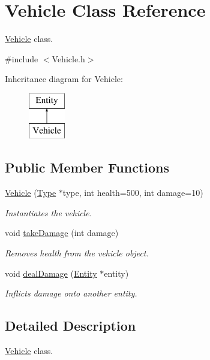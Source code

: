 \hypertarget{classVehicle}{}\section{Vehicle Class Reference}
\label{classVehicle}


\hyperlink{classVehicle}{Vehicle} class.  




{\ttfamily \#include $<$Vehicle.\+h$>$}

Inheritance diagram for Vehicle\+:\begin{figure}[H]
\begin{center}
\leavevmode
\includegraphics[height=2.000000cm]{classVehicle}
\end{center}
\end{figure}
\subsection*{Public Member Functions}
\begin{DoxyCompactItemize}
\item 
\hyperlink{classVehicle_a6fb25af1c4f5a69022a64d25308d60e0}{Vehicle} (\hyperlink{classType}{Type} $\ast$type, int health=500, int damage=10)
\begin{DoxyCompactList}\small\item\em Instantiates the vehicle. \end{DoxyCompactList}\item 
void \hyperlink{classVehicle_ae30a3d13e4d254993acf808a94fdff8d}{take\+Damage} (int damage)
\begin{DoxyCompactList}\small\item\em Removes health from the vehicle object. \end{DoxyCompactList}\item 
void \hyperlink{classVehicle_a8a89569fb092d60bbb172ecd0d4ef4d1}{deal\+Damage} (\hyperlink{classEntity}{Entity} $\ast$entity)
\begin{DoxyCompactList}\small\item\em Inflicts damage onto another entity. \end{DoxyCompactList}\end{DoxyCompactItemize}


\subsection{Detailed Description}
\hyperlink{classVehicle}{Vehicle} class. 


